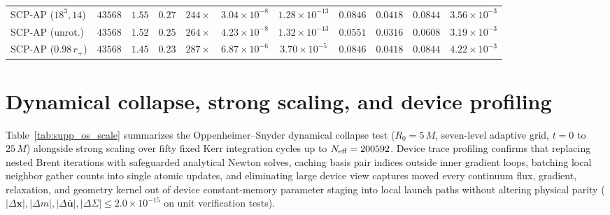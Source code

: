 \documentclass[twocolumn,prx,aps,superscriptaddress,nofootinbib,floatfix]{revtex4-2}
\begin{document}
\begin{table}[t]
\begin{ruledtabular}
\begin{tabular}{lcccccccccc}
SCP-AP ($18^3, 14$) & $43568$ & $1.55$ & $0.27$ & $244\times$ & $3.04\times 10^{-8}$ & $1.28\times 10^{-13}$ & $0.0846$ & $0.0418$ & $0.0844$ & $3.56\times 10^{-3}$ \\
SCP-AP (unrot.) & $43568$ & $1.52$ & $0.25$ & $264\times$ & $4.23\times 10^{-8}$ & $1.32\times 10^{-13}$ & $0.0551$ & $0.0316$ & $0.0608$ & $3.19\times 10^{-3}$ \\
SCP-AP ($0.98\,r_+$) & $43568$ & $1.45$ & $0.23$ & $287\times$ & $6.87\times 10^{-6}$ & $3.70\times 10^{-5}$ & $0.0846$ & $0.0418$ & $0.0844$ & $4.22\times 10^{-3}$ \\
\end{tabular}
\end{ruledtabular}
\end{table}

\section{Dynamical collapse, strong scaling, and device profiling}

Table~\ref{tab:supp_os_scale} summarizes the Oppenheimer--Snyder dynamical collapse test ($R_0 = 5\,M$, seven-level adaptive grid, $t = 0$ to $25\,M$) alongside strong scaling over fifty fixed Kerr integration cycles up to $N_{\rm eff} = 200592$. Device trace profiling confirms that replacing nested Brent iterations with safeguarded analytical Newton solves, caching basis pair indices outside inner gradient loops, batching local neighbor gather counts into single atomic updates, and eliminating large device view captures moved every continuum flux, gradient, relaxation, and geometry kernel out of device constant-memory parameter staging into local launch paths without altering physical parity ($|\Delta \bm{x}|, |\Delta m|, |\Delta \bar{\bm{u}}|, |\Delta \Sigma| \le 2.0 \times 10^{-15}$ on unit verification tests).
\end{document}
